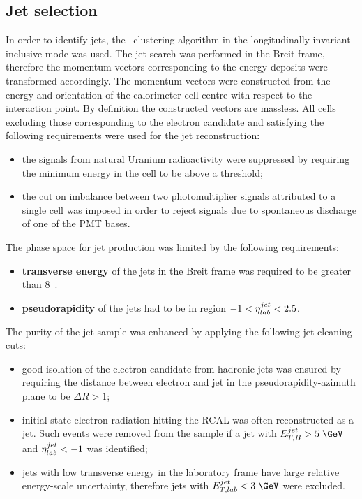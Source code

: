 \subsection{Jet selection}
\label{subsec:jetselect}
In order to identify jets, the \kt~clustering-algorithm in the longitudinally-invariant inclusive mode was used. The jet search was performed in the Breit frame, therefore the momentum vectors corresponding to the energy deposits were transformed accordingly. The momentum vectors were constructed from the energy and orientation of the calorimeter-cell centre with respect to the interaction point. By definition the constructed vectors are massless. All cells excluding those corresponding to the electron candidate and satisfying the following requirements were used for the jet reconstruction:
\begin{itemize}
	\item the signals from natural Uranium radioactivity were suppressed by requiring the minimum energy in the cell to be above a threshold;
	\item the cut on imbalance between two photomultiplier signals attributed to a single cell was imposed in order to reject signals due to spontaneous discharge of one of the PMT bases.
\end{itemize}

The phase space for jet production was limited by the following requirements:
\begin{itemize}
	\item \textbf{transverse energy} of the jets in the Breit frame was required to be greater than 8~\GeV.
	\item \textbf{pseudorapidity} of the jets had to be in region $-1<\mbox{$\eta^{jet}_{lab}$}<2.5$.
\end{itemize}
The purity of the jet sample was enhanced by applying the following jet-cleaning cuts:

\begin{itemize}
	\item good isolation of the electron candidate from hadronic jets was ensured by requiring the distance between electron and jet in the pseudorapidity-azimuth plane to be $\Delta R > 1$;
	\item initial-state electron radiation hitting the RCAL was often reconstructed as a jet. Such events were removed from the sample if a jet with $\etjetb > 5\;\GeV$ and $\mbox{$\eta^{jet}_{lab}$} < -1$ was identified;
	\item jets with low transverse energy in the laboratory frame have large relative energy-scale uncertainty, therefore jets with $\etjetlab < 3\;\GeV$ were excluded.
\end{itemize}

